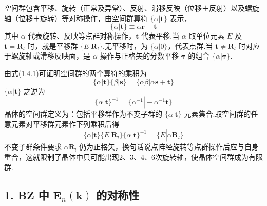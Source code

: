 空间群包含平移、旋转（正常及异常）、反射、滑移反映（位移＋反射）以及螺旋轴（位移＋旋转）等对称操作，由空间群算符 $\{\alpha|\boldsymbol{t}\}$ 表示，
\begin{equation}
  \{\alpha|\boldsymbol{t}\}\equiv\alpha\boldsymbol{r}+\boldsymbol{t}
\end{equation}
其中 $\alpha$ 代表旋转、反映等点群对称操作，$\boldsymbol{t}$ 代表平移.当 $\alpha$ 取单位元素 $E$ 及 $\boldsymbol{t}=\boldsymbol{R}_l$ 时，就是平移群 $\{E|\boldsymbol{R}_l\}$.无平移时，为 $\{\alpha|0\}$，代表点群.当 $\boldsymbol{t}\neq\boldsymbol{R}_l$ 时对应于螺旋轴或滑移反映面，是 $\alpha$ 操作与正格矢的分数平移 $\boldsymbol{\tau}$ 的组合 $\{\alpha|\boldsymbol{\tau}\}$.

由式(1.4.1)可证明空间群的两个算符的乘积为
\begin{equation}
  \{\alpha|\boldsymbol{t}\}\{\beta|\boldsymbol{s}\}
  =\{\alpha\beta|\alpha\boldsymbol{s}+\boldsymbol{t}\}
\end{equation}
$\{\alpha|\boldsymbol{t}\}$ 之逆为
\begin{equation}
  \{\alpha|\boldsymbol{t}\}^{-1}
  =\{\alpha^{-1}|-\alpha^{-1}\boldsymbol{t}\}
\end{equation}
晶体的空间群定义为：包括平移群作为不变子群的 $\{\alpha|\boldsymbol{t}\}$ 元素集合.取空间群的任意元素对平移群元素作下列乘积后得
\begin{equation}
  \{\alpha|\boldsymbol{t}\}\{E|\boldsymbol{R}_l\}\{\alpha|\boldsymbol{t}\}^{-1}
  =\{E|\alpha\boldsymbol{R}_l\}
\end{equation}
不变子群条件要求 $\alpha\boldsymbol{R}_l$ 仍为正格矢，换句话说点阵经旋转等点群操作后应与自身重合，这就限制了晶体中只可能出现2、3、4、6次旋转轴，使晶体空间群成为有限群.

\subsection*{1. BZ 中 $\boldsymbol{E}_n(\boldsymbol{k})$ 的对称性}

